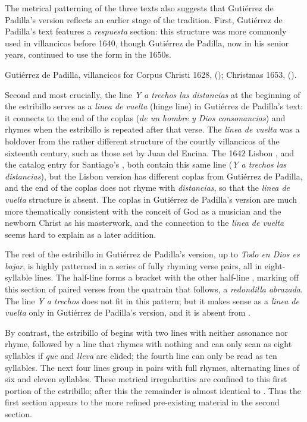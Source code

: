 The metrical patterning of the three texts also suggests that Gutiérrez de
Padilla's version reflects an earlier stage of the tradition.
First, Gutiérrez de Padilla's text features a \emph{respuesta} section: this
structure was more commonly used in villancicos before 1640, though Gutiérrez de
Padilla, now in his senior years, continued to use the form in the 1650s.%
\begin{Footnote}
    Gutiérrez de Padilla, villancicos for Corpus Christi 1628,  (); Christmas 1653,  ().
\end{Footnote}
Second and most crucially, the line \emph{Y a trechos las distancias} at the
beginning of the estribillo serves as a \emph{linea de vuelta} (hinge line) in
Gutiérrez de Padilla's text: it connects to the end of the coplas (\emph{de un
hombre y Dios consonancias}) and rhymes when the estribillo is repeated after
that verse.
The \emph{linea de vuelta} was a holdover from the rather different structure of
the courtly villancicos of the sixteenth century, such as those set by Juan del
Encina.%
    \Autocite{Navarro:Metrica} %
The 1642 Lisbon , and the catalog entry for Santiago's
, both contain this same line (\emph{Y a trechos las distancias}),
but the Lisbon version has different coplas from Gutiérrez de Padilla, and the
end of the coplas does not rhyme with \emph{distancias}, so that the \emph{linea
de vuelta} structure is absent.
The  coplas in Gutiérrez de Padilla's version are much more
thematically consistent with the conceit of God as a musician and the newborn
Christ as his masterwork, and the connection to the \emph{linea de vuelta} seems
hard to explain as a later addition.

The rest of the estribillo in Gutiérrez de Padilla's version, up to \emph{Todo
en Dios es bajar}, is highly patterned in a series of fully rhyming verse pairs,
all in eight-syllable lines.
The half-line  forms a bracket with the other half-line
, marking off this section of paired verses from the
quatrain that follows, a \emph{redondilla abrazada}.
The line \emph{Y a trechos} does not fit in this pattern; but it makes sense as
a \emph{linea de vuelta} only in Gutiérrez de Padilla's version, and it is
absent from .

By contrast, the estribillo of  begins with two lines with
neither assonance nor rhyme, followed by a line that rhymes with nothing and can
only scan as eight syllables if \emph{que} and \emph{lleva} are elided; the
fourth line can only be read as ten syllables.
The next four lines group in pairs with full rhymes, alternating lines of six
and eleven syllables.
These metrical irregularities are confined to this first portion of the
estribillo; after this the remainder is almost identical to .
Thus the first section appears  to the more refined
pre-existing material in the second section.

